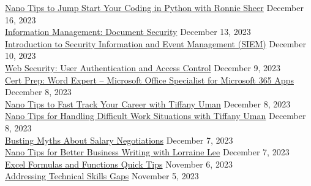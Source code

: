 \documentclass[10pt]{res} %
\begin{document}
\begin{resume}
\href{https://www.linkedin.com/learning/certificates/7605ed7124cfa40c1fef91f60a45023a2dc235ff5bcba5dd64d951362783e4fc}{\color{blue}Nano Tips to Jump Start Your Coding in Python with Ronnie Sheer} \hfill December 16, 2023 \\
\href{https://www.linkedin.com/learning/certificates/dd3ab16fb4cc7b75ffe2c73a1d1c87c86f8e741dd3f7a58f1ab0c72605b08556}{\color{blue}Information Management: Document Security} \hfill December 13, 2023 \\
\href{https://www.linkedin.com/learning/certificates/651cf33079fa7b487ee376fee7e4cf94996e7c158ce9453027838677e9ed66ec}{\color{blue}Introduction to Security Information and Event Management (SIEM)} \hfill December 10, 2023 \\
\href{https://www.linkedin.com/learning/certificates/97d004d542be79dbcd9ed9ae71fe1d55f903e2cf2a6aa1248b126a11aa3f48f6}{\color{blue}Web Security: User Authentication and Access Control} \hfill December 9, 2023 \\
\href{https://www.linkedin.com/learning/certificates/e6c11aadf8b64ae11eac8a799df44c43b32d38cd8d585c3aa693b0842cfc91d9}{\color{blue}Cert Prep: Word Expert -- Microsoft Office Specialist for Microsoft 365 Apps} \hfill December 8, 2023 \\
\href{https://www.linkedin.com/learning/certificates/d6c62af5612de281bb4750dfdd55fd6f2504e4909b3107a2a5e722f7b0f777e1}{\color{blue}Nano Tips to Fast Track Your Career with Tiffany Uman} \hfill December 8, 2023 \\
\href{https://www.linkedin.com/learning/certificates/f1b24bf79c7e8ec967012ce6d59a5df88c2523ba9cc4186e7c4ee2c8c830df22}{\color{blue}Nano Tips for Handling Difficult Work Situations with Tiffany Uman} \hfill December 8, 2023 \\
\href{https://www.linkedin.com/learning/certificates/593795ae837fd23f42f43d51704d6fe345edffc87962c3d4007dfaf7361f65e8}{\color{blue}Busting Myths About Salary Negotiations} \hfill December 7, 2023 \\
\href{https://www.linkedin.com/learning/certificates/e2319940de925ccc2f5a4421d5c13befa7bfcc53b5a803bf90468fb18eb8c754}{\color{blue}Nano Tips for Better Business Writing with Lorraine Lee} \hfill December 7, 2023 \\
\href{https://www.linkedin.com/learning/certificates/8267d0679e58fd485a0c894ad039401390e3f7631db6539bf53022fe1e546036}{\color{blue}Excel Formulas and Functions Quick Tips} \hfill November 6, 2023 \\
\href{https://www.linkedin.com/learning/certificates/1b04d5b5eef97bd9f09a3c185aa3bec97d44822a46651a4f9944e9d846ccfe50}{\color{blue}Addressing Technical Skills Gaps} \hfill November 5, 2023 \\

\end{resume}
\end{document}
